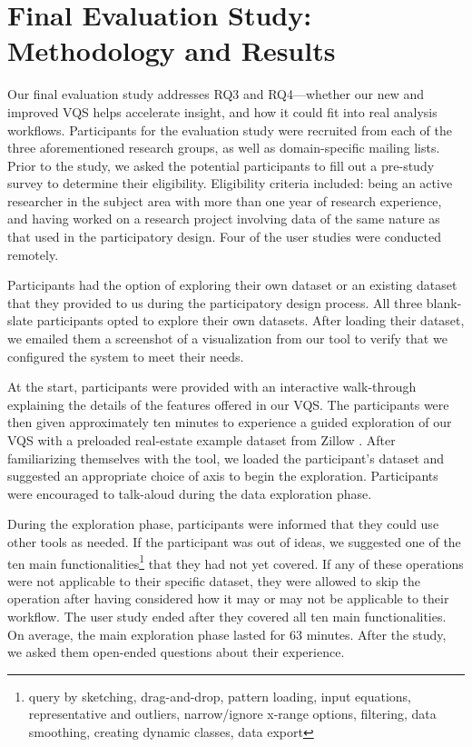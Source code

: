 \section{Final Evaluation Study: Methodology and Results} \label{evaluation}
\par Our final evaluation study addresses RQ3 and RQ4---whether our new and improved VQS helps accelerate insight, and how it could fit into real analysis workflows. Participants for the evaluation study were recruited from each of the three aforementioned research groups, as well as domain-specific mailing lists. Prior to the study, we asked the potential participants to fill out a pre-study survey to determine their eligibility. Eligibility criteria included: being an active researcher in the subject area with more than one year of research experience, and having worked on a research project involving data of the same nature as that used in the participatory design. Four of the user studies were conducted remotely.  
\par Participants had the option of exploring their own dataset or an existing dataset that they provided to us during the participatory design process. All three blank-slate participants opted to explore their own datasets. After loading their dataset, we emailed them a screenshot of a visualization from our tool to verify that we configured the system to meet their needs. 
\par At the start, participants were provided with an interactive walk-through explaining the details of the features offered in our VQS. The participants were then given approximately ten minutes to experience a guided exploration of our VQS with a preloaded real-estate example dataset from Zillow \cite{zillow}. After familiarizing themselves with the tool, we loaded the participant's dataset and suggested an appropriate choice of axis to begin the exploration. Participants were encouraged to talk-aloud during the data exploration phase.
\par During the exploration phase, participants were informed that they could use other tools as needed. If the participant was out of ideas, we suggested one of the ten main functionalities\footnote{query by sketching, drag-and-drop, pattern loading, input equations, representative and outliers, narrow/ignore x-range options, filtering, data smoothing, creating dynamic classes,  data export} that they had not yet covered. If any of these operations were not applicable to their specific dataset, they were allowed to skip the operation after having considered how it may or may not be applicable to their workflow. The user study ended after they covered all ten main functionalities. On average, the main exploration phase lasted for 63 minutes. After the study, we asked them open-ended questions about their experience. 
